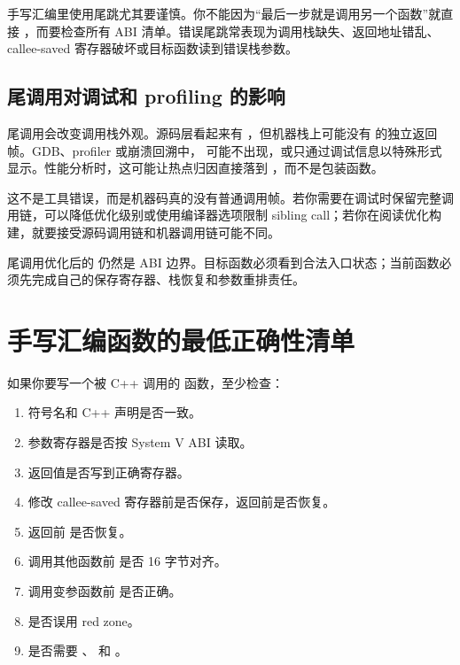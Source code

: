 手写汇编里使用尾跳尤其要谨慎。你不能因为“最后一步就是调用另一个函数”就直接 ，而要检查所有 ABI 清单。错误尾跳常表现为调用栈缺失、返回地址错乱、callee-saved 寄存器破坏或目标函数读到错误栈参数。

\subsection{尾调用对调试和 profiling 的影响}

尾调用会改变调用栈外观。源码层看起来有 ，但机器栈上可能没有  的独立返回帧。GDB、profiler 或崩溃回溯中， 可能不出现，或只通过调试信息以特殊形式显示。性能分析时，这可能让热点归因直接落到 ，而不是包装函数。

这不是工具错误，而是机器码真的没有普通调用帧。若你需要在调试时保留完整调用链，可以降低优化级别或使用编译器选项限制 sibling call；若你在阅读优化构建，就要接受源码调用链和机器调用链可能不同。

\begin{warningbox}
尾调用优化后的  仍然是 ABI 边界。目标函数必须看到合法入口状态；当前函数必须先完成自己的保存寄存器、栈恢复和参数重排责任。
\end{warningbox}

\section{手写汇编函数的最低正确性清单}

如果你要写一个被 C++ 调用的  函数，至少检查：

\begin{enumerate}
  \item 符号名和 C++ 声明是否一致。
  \item 参数寄存器是否按 System V ABI 读取。
  \item 返回值是否写到正确寄存器。
  \item 修改 callee-saved 寄存器前是否保存，返回前是否恢复。
  \item 返回前  是否恢复。
  \item 调用其他函数前  是否 16 字节对齐。
  \item 调用变参函数前  是否正确。
  \item 是否误用 red zone。
  \item 是否需要 、 和 。
\end{enumerate}

